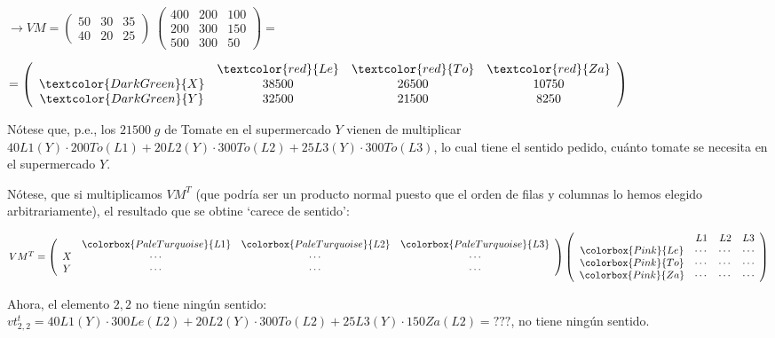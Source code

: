 \begin{proofw}
$\to VM=\left( \begin{array}{ccc}  50&30&35\\40&20&25   \end{array} \right) \; 
\left( \begin{array}{ccc}  400&200&100\\200&300&150\\500&300&50   \end{array} \right) =$

$=\left( \begin{array}{cccc} &\textcolor{red}{Le}&\textcolor{red}{To}&\textcolor{red}{Za} \\ \textcolor{DarkGreen}{X}&38500&26500&10750\\\textcolor{DarkGreen}{Y}&32500&21500& 8250  \end{array} \right)$

Nótese que, p.e., los $21500\; g$ de Tomate en el supermercado $Y$ vienen de multiplicar $40 L1(Y) \cdot 200 To(L1)+ 20 L2(Y)\cdot 300To(L2)+25 L3(Y)\cdot 300 To(L3)$, lo cual tiene el sentido pedido, cuánto tomate se necesita en el supermercado $Y$.

Nótese,  que si multiplicamos $VM^T$ (que podría ser un producto normal puesto que el orden de filas y columnas lo hemos elegido arbitrariamente), el resultado que se obtine 	`carece de sentido':

$VM^T =\left( \begin{array}{cccc} &\colorbox{PaleTurquoise}{L1}&\colorbox{PaleTurquoise}{L2}&\colorbox{PaleTurquoise}{L3}  \\ X& \cdots&\cdots&\cdots \\    Y&\cdots&\cdots&\cdots   \end{array} \right) 
\left( \begin{array}{cccc} &L1&L2&L3  \\ \colorbox{Pink}{Le}& \cdots&\cdots&\cdots \\    \colorbox{Pink}{To}&\cdots&\cdots&\cdots  \\ \colorbox{Pink}{Za}&\cdots&\cdots&\cdots   \end{array} \right)$

Ahora, el elemento $2,2$ no tiene ningún sentido: $vt^t_{2,2}= 40L1(Y)\cdot 300Le(L2)+20L2(Y)\cdot 300 To(L2)+ 25L3(Y)\cdot 150Za(L2)=???$, no tiene ningún sentido.
\end{proofw}



